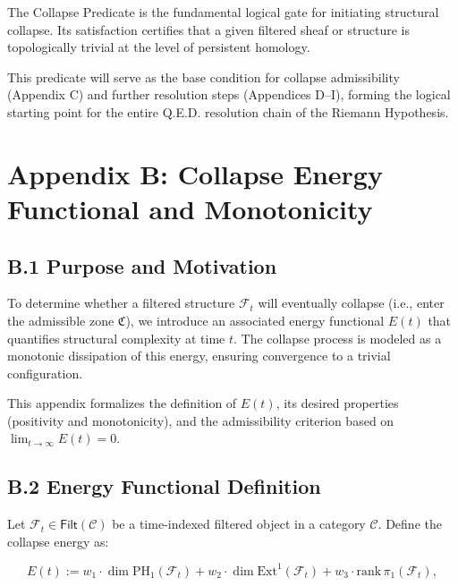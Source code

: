 \documentclass[11pt]{article}
\begin{document}
The Collapse Predicate is the fundamental logical gate for initiating structural collapse. Its satisfaction certifies that a given filtered sheaf or structure is topologically trivial at the level of persistent homology.

This predicate will serve as the base condition for collapse admissibility (Appendix C) and further resolution steps (Appendices D–I), forming the logical starting point for the entire Q.E.D. resolution chain of the Riemann Hypothesis.



\appendix
\section*{Appendix B: Collapse Energy Functional and Monotonicity}

\subsection*{B.1 Purpose and Motivation}

To determine whether a filtered structure \( \mathcal{F}_t \) will eventually collapse (i.e., enter the admissible zone \( \mathfrak{C} \)), we introduce an associated energy functional \( E(t) \) that quantifies structural complexity at time \( t \). The collapse process is modeled as a monotonic dissipation of this energy, ensuring convergence to a trivial configuration.

This appendix formalizes the definition of \( E(t) \), its desired properties (positivity and monotonicity), and the admissibility criterion based on \( \lim_{t \to \infty} E(t) = 0 \).

\subsection*{B.2 Energy Functional Definition}

Let \( \mathcal{F}_t \in \mathsf{Filt}(\mathcal{C}) \) be a time-indexed filtered object in a category \( \mathcal{C} \). Define the collapse energy as:

\[
E(t) := w_1 \cdot \dim \mathrm{PH}_1(\mathcal{F}_t) + w_2 \cdot \dim \mathrm{Ext}^1(\mathcal{F}_t) + w_3 \cdot \mathrm{rank}\, \pi_1(\mathcal{F}_t),
\]
\end{document}
